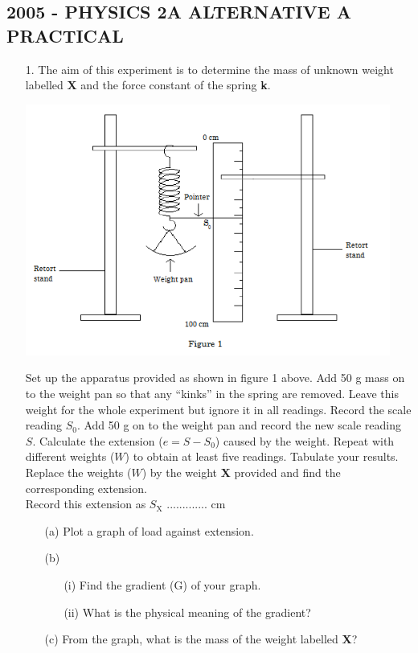\subsection{2005 - PHYSICS 2A ALTERNATIVE A PRACTICAL}

\begin{enumerate}
\item[1.] The aim of this experiment is to determine the mass of unknown weight labelled \textbf{X} and the force constant of the spring \textbf{k}.

\begin{center}
\includegraphics[width=12cm]{./img/2005-1-alt.png}
\end{center}

Set up the apparatus provided as shown in figure 1 above. Add 50 g mass on to the weight pan so that any ``kinks'' in the spring are removed. Leave this weight for the whole experiment but ignore it in all readings. Record the scale reading $S_0$. Add 50 g on to the weight pan and record the new scale reading $S$. Calculate the extension ($e = S - S_0$) caused by the weight. Repeat with different weights ($W$) to obtain at least five readings. Tabulate your results. Replace the weights ($W$) by the weight \textbf{X} provided and find the corresponding extension.\\[10pt]

Record this extension as $S_{\text{X}}$ ............. cm

\begin{enumerate}
\item[(a)] Plot a graph of load against extension.
\item[(b)]
\begin{enumerate}
\item[(i)] Find the gradient (G) of your graph.
\item[(ii)] What is the physical meaning of the gradient?
\end{enumerate}
\item[(c)] From the graph, what is the mass of the weight labelled \textbf{X}?
\end{enumerate}


\end{enumerate}
